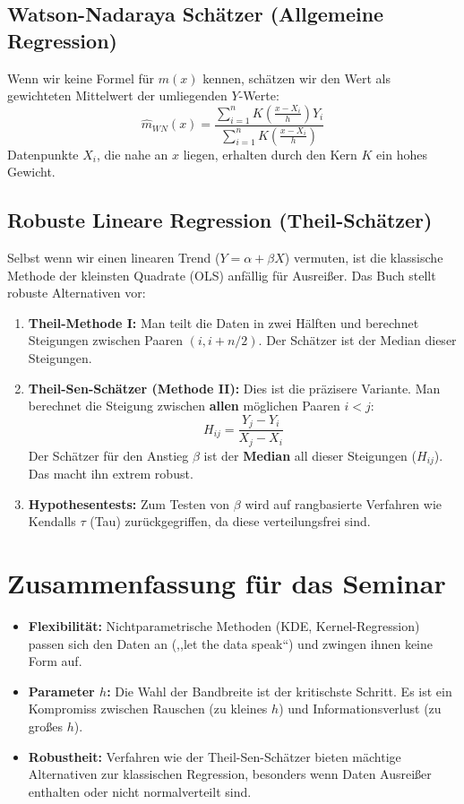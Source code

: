 \documentclass[a4paper, 11pt]{scrartcl}
\newif\ifshowtext
\begin{document}
\subsection{Watson-Nadaraya Schätzer (Allgemeine Regression)}
Wenn wir keine Formel für $m(x)$ kennen, schätzen wir den Wert als gewichteten Mittelwert der umliegenden $Y$-Werte:
\begin{equation}
	\hat{m}_{WN}(x) = \frac{\sum_{i=1}^n K\left(\frac{x - X_i}{h}\right) Y_i}{\sum_{i=1}^n K\left(\frac{x - X_i}{h}\right)}
\end{equation}
Datenpunkte $X_i$, die nahe an $x$ liegen, erhalten durch den Kern $K$ ein hohes Gewicht.
	
\subsection{Robuste Lineare Regression (Theil-Schätzer)}
Selbst wenn wir einen linearen Trend ($Y = \alpha + \beta X$) vermuten, ist die klassische Methode der kleinsten Quadrate (OLS) anfällig für Ausreißer. Das Buch stellt robuste Alternativen vor:
	
\begin{enumerate}
	\item \textbf{Theil-Methode I:} Man teilt die Daten in zwei Hälften und berechnet Steigungen zwischen Paaren $(i, i+n/2)$. Der Schätzer ist der Median dieser Steigungen.
	\item \textbf{Theil-Sen-Schätzer (Methode II):} Dies ist die präzisere Variante. Man berechnet die Steigung zwischen \textbf{allen} möglichen Paaren $i < j$:
	      \begin{equation}
	      	H_{ij} = \frac{Y_j - Y_i}{X_j - X_i}
	      \end{equation}
	      Der Schätzer für den Anstieg $\beta$ ist der \textbf{Median} all dieser Steigungen ($H_{ij}$). Das macht ihn extrem robust.
	\item \textbf{Hypothesentests:} Zum Testen von $\beta$ wird auf rangbasierte Verfahren wie Kendalls $\tau$ (Tau) zurückgegriffen, da diese verteilungsfrei sind.
\end{enumerate}
	
\section{Zusammenfassung für das Seminar}
\begin{itemize}
	\item \textbf{Flexibilität:} Nichtparametrische Methoden (KDE, Kernel-Regression) passen sich den Daten an (,,let the data speak``) und zwingen ihnen keine Form auf.
	\item \textbf{Parameter $h$:} Die Wahl der Bandbreite ist der kritischste Schritt. Es ist ein Kompromiss zwischen Rauschen (zu kleines $h$) und Informationsverlust (zu großes $h$).
	\item \textbf{Robustheit:} Verfahren wie der Theil-Sen-Schätzer bieten mächtige Alternativen zur klassischen Regression, besonders wenn Daten Ausreißer enthalten oder nicht normalverteilt sind.
\end{itemize}
			
\ifshowtext
\printbibliography
\fi

	
\end{document}

